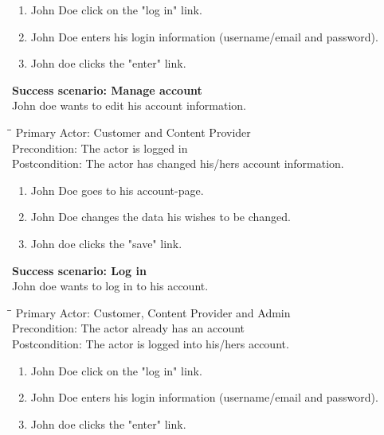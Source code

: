 \begin{enumerate} \setlength{\itemsep}{-1mm}
	\item John Doe click on the "log in" link.
	\item John Doe enters his login information (username/email and password).
	\item John doe clicks the "enter" link.
\end{enumerate}
\vspace{3mm}
\textbf{Success scenario: Manage account} \\
John doe wants to edit his account information.
\begin{tabbing}
\hspace{5mm}\=\hspace{26mm}\=\kill
\>Primary Actor:\> Customer and Content Provider\\
\>Precondition:\> The actor is logged in\\
\>Postcondition:\> The actor has changed his/hers account information.
\end{tabbing}
\begin{enumerate} \setlength{\itemsep}{-1mm}
	\item John Doe goes to his account-page.
	\item John Doe changes the data his wishes to be changed.
	\item John doe clicks the "save" link.
\end{enumerate}
\vspace{3mm}
\textbf{Success scenario: Log in} \\
John doe wants to log in to his account. 
\begin{tabbing}
\hspace{5mm}\=\hspace{26mm}\=\kill
\>Primary Actor:\> Customer, Content Provider and Admin\\
\>Precondition:\> The actor already has an account\\
\>Postcondition:\> The actor is logged into his/hers account.
\end{tabbing}
\begin{enumerate} \setlength{\itemsep}{-1mm}
	\item John Doe click on the "log in" link.
	\item John Doe enters his login information (username/email and password).
	\item John doe clicks the "enter" link.
\end{enumerate}
\vspace{3mm}
